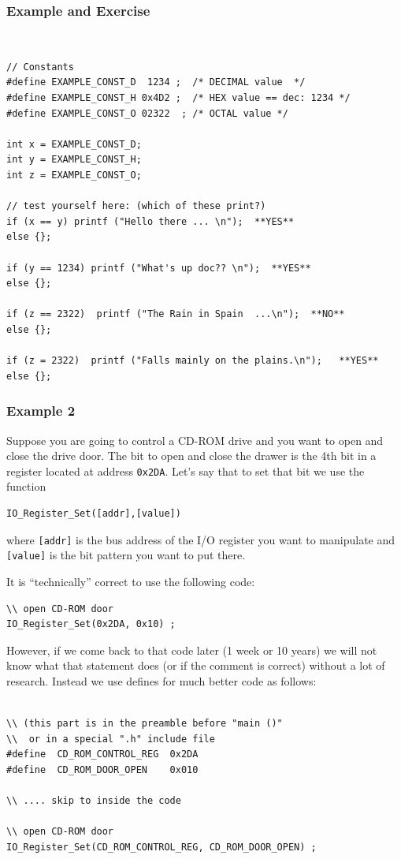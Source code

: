 \documentclass{article}	%
\begin{document}
\subsubsection{Example and Exercise}
{\small\tt
\begin{verbatim}
// Constants
#define EXAMPLE_CONST_D  1234 ;  /* DECIMAL value  */
#define EXAMPLE_CONST_H 0x4D2 ;  /* HEX value == dec: 1234 */
#define EXAMPLE_CONST_O 02322  ; /* OCTAL value */

int x = EXAMPLE_CONST_D;
int y = EXAMPLE_CONST_H;
int z = EXAMPLE_CONST_O;

// test yourself here: (which of these print?)
if (x == y) printf ("Hello there ... \n");  **YES**
else {};

if (y == 1234) printf ("What's up doc?? \n");  **YES**
else {};

if (z == 2322)  printf ("The Rain in Spain  ...\n");  **NO**
else {};

if (z = 2322)  printf ("Falls mainly on the plains.\n");   **YES**
else {};

\end{verbatim}
}




\subsubsection{Example 2}
Suppose you are going to control a CD-ROM drive and you want
to open and close the drive door.  The bit to open and close
the drawer is the 4th bit in a register located at address
{\tt 0x2DA}.  Let's say that to set that bit we use the function
\begin{verbatim}
IO_Register_Set([addr],[value])
\end{verbatim}
where {\tt [addr]}
is the bus address of the I/O register you want to manipulate
and {\tt [value]} is the bit pattern you want to put there.

It is ``technically'' correct to use the following code:
\begin{verbatim}
\\ open CD-ROM door
IO_Register_Set(0x2DA, 0x10) ;
\end{verbatim}



However, if we come back to that code later (1 week or 10 years)
we will not know what that statement does (or if the comment is
correct) without a lot of research.  Instead we use defines
for much better code as follows:
\begin{verbatim}

\\ (this part is in the preamble before "main ()"
\\  or in a special ".h" include file
#define  CD_ROM_CONTROL_REG  0x2DA
#define  CD_ROM_DOOR_OPEN    0x010

\\ .... skip to inside the code

\\ open CD-ROM door
IO_Register_Set(CD_ROM_CONTROL_REG, CD_ROM_DOOR_OPEN) ;

\end{verbatim}
\end{document}

